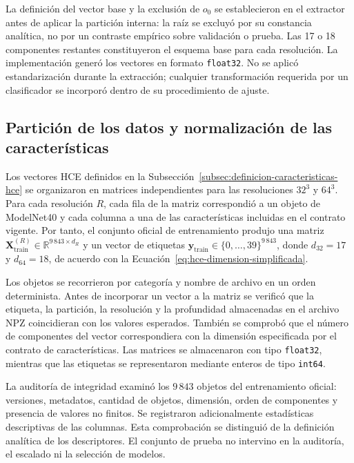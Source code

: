 La definición del vector base y la exclusión de $o_0$ se establecieron en el extractor antes de aplicar la partición interna: la raíz se excluyó por su constancia analítica, no por un contraste empírico sobre validación o prueba. Las 17 o 18 componentes restantes constituyeron el esquema base para cada resolución. La implementación generó los vectores en formato \texttt{float32}. No se aplicó estandarización durante la extracción; cualquier transformación requerida por un clasificador se incorporó dentro de su procedimiento de ajuste.

\subsection{Partición de los datos y normalización de las características}
\label{subsec:particion-normalizacion-hce}

Los vectores HCE definidos en la Subsección~\ref{subsec:definicion-caracteristicas-hce} se organizaron en matrices independientes para las resoluciones $32^3$ y $64^3$. Para cada resolución $R$, cada fila de la matriz correspondió a un objeto de ModelNet40 y cada columna a una de las características incluidas en el contrato vigente. Por tanto, el conjunto oficial de entrenamiento produjo una matriz $\mathbf X_{\mathrm{train}}^{(R)}\in\mathbb R^{9\,843\times d_R}$ y un vector de etiquetas $\mathbf y_{\mathrm{train}}\in\{0,\ldots,39\}^{9\,843}$, donde $d_{32}=17$ y $d_{64}=18$, de acuerdo con la Ecuación~\eqref{eq:hce-dimension-simplificada}.

Los objetos se recorrieron por categoría y nombre de archivo en un orden determinista. Antes de incorporar un vector a la matriz se verificó que la etiqueta, la partición, la resolución y la profundidad almacenadas en el archivo NPZ coincidieran con los valores esperados. También se comprobó que el número de componentes del vector correspondiera con la dimensión especificada por el contrato de características. Las matrices se almacenaron con tipo \texttt{float32}, mientras que las etiquetas se representaron mediante enteros de tipo \texttt{int64}.

La auditoría de integridad examinó los $9\,843$ objetos del entrenamiento oficial: versiones, metadatos, cantidad de objetos, dimensión, orden de componentes y presencia de valores no finitos. Se registraron adicionalmente estadísticas descriptivas de las columnas. Esta comprobación se distinguió de la definición analítica de los descriptores. El conjunto de prueba no intervino en la auditoría, el escalado ni la selección de modelos.

